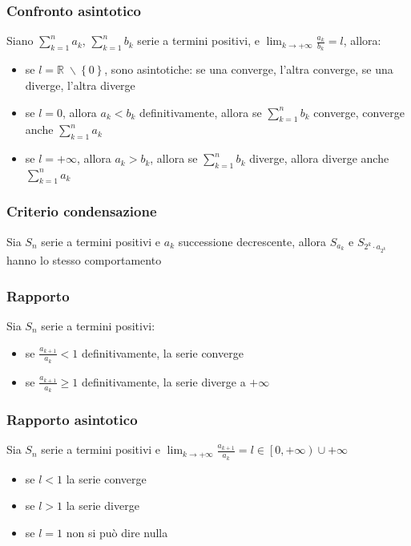\documentclass[a4paper]{article}
\begin{document}
\subsubsection*{Confronto asintotico}
Siano \(\displaystyle \sum_{k = 1}^{n} a_k\), \(\displaystyle \sum_{k = 1}^{n} b_k\) serie a termini positivi, e \(\displaystyle \lim_{k \to +\infty} \frac{a_k}{b_k} = l\), allora:
\begin{itemize}
	\item se \(l = \mathbb{R} \; \backslash \left\{0\right\}\), sono asintotiche: se una converge, l'altra converge, se una diverge, l'altra diverge
	\item se \(l = 0\), allora \(a_k < b_k\) definitivamente, allora se \(\sum_{k = 1}^{n} b_k\) converge, converge anche \(\sum_{k = 1}^{n} a_k\)
	\item se \(l = +\infty\), allora \(a_k > b_k\), allora se \(\sum_{k = 1}^{n} b_k\) diverge, allora diverge anche \(\sum_{k = 1}^{n} a_k\)
\end{itemize}

\subsubsection*{Criterio condensazione}
Sia \(S_n\) serie a termini positivi e \(a_k\) successione decrescente, allora \(S_{a_k}\) e \(\displaystyle S_{2^k \cdot a_{2^k}}\) hanno lo stesso comportamento

\subsubsection*{Rapporto}
Sia \(S_n\) serie a termini positivi:
\begin{itemize}
	\item se \(\displaystyle \frac{a_{k + 1}}{a_k} < 1\) definitivamente, la serie converge
	\item se \(\displaystyle \frac{a_{k + 1}}{a_k} \geq 1\) definitivamente, la serie diverge a \(+ \infty\)
\end{itemize}

\subsubsection*{Rapporto asintotico}
Sia \(S_n\) serie a termini positivi e \(\displaystyle \lim_{k \to +\infty} \frac{a_{k+1}}{a_k} = l \in \left[0, +\infty \right) \cup +\infty \)
\begin{itemize}
	\item se \(l < 1\) la serie converge
	\item se \(l > 1\) la serie diverge
	\item se \(l = 1\) non si può dire nulla
\end{itemize}
\end{document}
